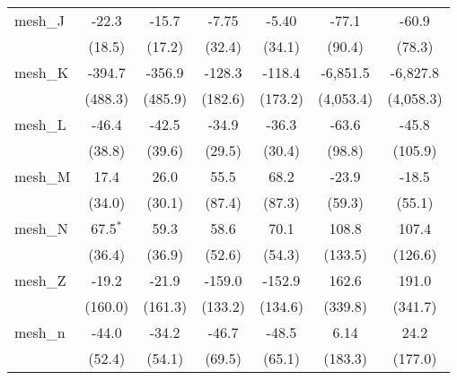 \begin{tabular}{lcccccc}
   mesh\_J                                                     & -22.3         & -15.7       & -7.75          & -5.40         & -77.1        & -60.9\\   
                                                               & (18.5)        & (17.2)      & (32.4)         & (34.1)        & (90.4)       & (78.3)\\   
   mesh\_K                                                     & -394.7        & -356.9      & -128.3         & -118.4        & -6,851.5     & -6,827.8\\   
                                                               & (488.3)       & (485.9)     & (182.6)        & (173.2)       & (4,053.4)    & (4,058.3)\\   
   mesh\_L                                                     & -46.4         & -42.5       & -34.9          & -36.3         & -63.6        & -45.8\\   
                                                               & (38.8)        & (39.6)      & (29.5)         & (30.4)        & (98.8)       & (105.9)\\   
   mesh\_M                                                     & 17.4          & 26.0        & 55.5           & 68.2          & -23.9        & -18.5\\   
                                                               & (34.0)        & (30.1)      & (87.4)         & (87.3)        & (59.3)       & (55.1)\\   
   mesh\_N                                                     & 67.5$^{*}$    & 59.3        & 58.6           & 70.1          & 108.8        & 107.4\\   
                                                               & (36.4)        & (36.9)      & (52.6)         & (54.3)        & (133.5)      & (126.6)\\   
   mesh\_Z                                                     & -19.2         & -21.9       & -159.0         & -152.9        & 162.6        & 191.0\\   
                                                               & (160.0)       & (161.3)     & (133.2)        & (134.6)       & (339.8)      & (341.7)\\   
   mesh\_n                                                     & -44.0         & -34.2       & -46.7          & -48.5         & 6.14         & 24.2\\   
                                                               & (52.4)        & (54.1)      & (69.5)         & (65.1)        & (183.3)      & (177.0)\\   

\end{tabular}

